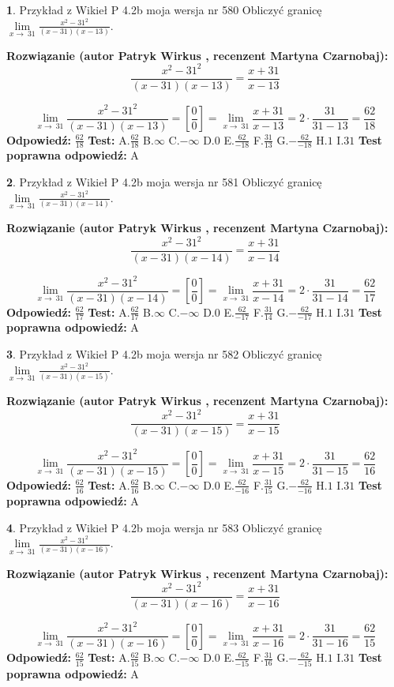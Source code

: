 \documentclass[12pt, a4paper]{article}
\theoremstyle{definition} %
\newtheorem{zad}{}
\newcommand{\zadStart}[1]{\begin{zad}#1\newline}
\newcommand{\zadStop}{\end{zad}}
\newcommand{\rozwStart}[2]{\noindent \textbf{Rozwiązanie (autor #1 , recenzent #2): }\newline}
\newcommand{\rozwStop}{\newline}
\newcommand{\odpStart}{\noindent \textbf{Odpowiedź:}\newline}
\newcommand{\odpStop}{\newline}
\newcommand{\testStart}{\noindent \textbf{Test:}\newline}
\newcommand{\testStop}{\newline}
\newcommand{\kluczStart}{\noindent \textbf{Test poprawna odpowiedź:}\newline}
\newcommand{\kluczStop}{\newline}
\begin{document}
\zadStart{Przykład z Wikieł P 4.2b moja wersja nr 580}
Obliczyć granicę $\lim\limits_{x\to\ 31}\frac{x^{2}-31^{2}}{(x-31)(x-13)}$.
\zadStop
\rozwStart{Patryk Wirkus}{Martyna Czarnobaj}
$$\frac{x^{2}-31^{2}}{(x-31)(x-13)}=\frac{x+31}{x-13}$$

$$\lim\limits_{x\to\ 31}\frac{x^{2}-31^{2}}{(x-31)(x-13)}=[\frac{0}{0}]=\lim\limits_{x\to\ 31}\frac{x+31}{x-13}=2 \cdot \frac{31}{31-13} = \frac{62}{18}$$
\rozwStop
\odpStart
$\frac{62}{18}$
\odpStop
\testStart
A.$\frac{62}{18}$
B.$\infty$
C.$-\infty$
D.$0$
E.$\frac{62}{-18}$
F.$\frac{31}{13}$
G.$-\frac{62}{-18}$
H.$1$
I.$31$
\testStop
\kluczStart
A
\kluczStop



\zadStart{Przykład z Wikieł P 4.2b moja wersja nr 581}
Obliczyć granicę $\lim\limits_{x\to\ 31}\frac{x^{2}-31^{2}}{(x-31)(x-14)}$.
\zadStop
\rozwStart{Patryk Wirkus}{Martyna Czarnobaj}
$$\frac{x^{2}-31^{2}}{(x-31)(x-14)}=\frac{x+31}{x-14}$$

$$\lim\limits_{x\to\ 31}\frac{x^{2}-31^{2}}{(x-31)(x-14)}=[\frac{0}{0}]=\lim\limits_{x\to\ 31}\frac{x+31}{x-14}=2 \cdot \frac{31}{31-14} = \frac{62}{17}$$
\rozwStop
\odpStart
$\frac{62}{17}$
\odpStop
\testStart
A.$\frac{62}{17}$
B.$\infty$
C.$-\infty$
D.$0$
E.$\frac{62}{-17}$
F.$\frac{31}{14}$
G.$-\frac{62}{-17}$
H.$1$
I.$31$
\testStop
\kluczStart
A
\kluczStop



\zadStart{Przykład z Wikieł P 4.2b moja wersja nr 582}
Obliczyć granicę $\lim\limits_{x\to\ 31}\frac{x^{2}-31^{2}}{(x-31)(x-15)}$.
\zadStop
\rozwStart{Patryk Wirkus}{Martyna Czarnobaj}
$$\frac{x^{2}-31^{2}}{(x-31)(x-15)}=\frac{x+31}{x-15}$$

$$\lim\limits_{x\to\ 31}\frac{x^{2}-31^{2}}{(x-31)(x-15)}=[\frac{0}{0}]=\lim\limits_{x\to\ 31}\frac{x+31}{x-15}=2 \cdot \frac{31}{31-15} = \frac{62}{16}$$
\rozwStop
\odpStart
$\frac{62}{16}$
\odpStop
\testStart
A.$\frac{62}{16}$
B.$\infty$
C.$-\infty$
D.$0$
E.$\frac{62}{-16}$
F.$\frac{31}{15}$
G.$-\frac{62}{-16}$
H.$1$
I.$31$
\testStop
\kluczStart
A
\kluczStop



\zadStart{Przykład z Wikieł P 4.2b moja wersja nr 583}
Obliczyć granicę $\lim\limits_{x\to\ 31}\frac{x^{2}-31^{2}}{(x-31)(x-16)}$.
\zadStop
\rozwStart{Patryk Wirkus}{Martyna Czarnobaj}
$$\frac{x^{2}-31^{2}}{(x-31)(x-16)}=\frac{x+31}{x-16}$$

$$\lim\limits_{x\to\ 31}\frac{x^{2}-31^{2}}{(x-31)(x-16)}=[\frac{0}{0}]=\lim\limits_{x\to\ 31}\frac{x+31}{x-16}=2 \cdot \frac{31}{31-16} = \frac{62}{15}$$
\rozwStop
\odpStart
$\frac{62}{15}$
\odpStop
\testStart
A.$\frac{62}{15}$
B.$\infty$
C.$-\infty$
D.$0$
E.$\frac{62}{-15}$
F.$\frac{31}{16}$
G.$-\frac{62}{-15}$
H.$1$
I.$31$
\testStop
\kluczStart
A
\kluczStop
\end{document}
